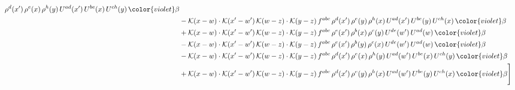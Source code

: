 \begin{align}
\rho^{d}(x')\,\rho^{e}(x)\,\rho^{h}(y)\,U^{ad}(x')\,U^{be}(x)\,U^{ch}(y)\, {\color{violet} \beta} \notag \\ & - \mathcal{K}(x-w) \cdot \mathcal{K}(x'-w')\, \mathcal{K}(w-z)\cdot \mathcal{K}(y-z)\, f^{abc}\, \rho^{d}(x')\,\rho^{e}(y)\,\rho^{h}(x)\,U^{ad}(x')\,U^{be}(y)\,U^{ch}(x)\, {\color{violet} \beta} \notag \\ & + \mathcal{K}(x-w) \cdot \mathcal{K}(x'-w')\, \mathcal{K}(w-z)\cdot \mathcal{K}(y-z)\, f^{abc}\, \rho^{e}(x')\,\rho^{b}(x)\,\rho^{c}(y)\,U^{de}(w')\,U^{ad}(w)\,{\color{violet} \beta} \notag \\ & - \mathcal{K}(x-w) \cdot \mathcal{K}(x'-w')\, \mathcal{K}(w-z)\cdot \mathcal{K}(y-z)\, f^{abc}\, \rho^{e}(x')\,\rho^{b}(y)\,\rho^{c}(x)\,U^{de}(w')\,U^{ad}(w)\, {\color{violet} \beta} \notag \\ & - \mathcal{K}(x-w) \cdot \mathcal{K}(x'-w')\, \mathcal{K}(w-z)\cdot \mathcal{K}(y-z)\, f^{abc}\, \rho^{d}(x')\,\rho^{e}(x)\,\rho^{h}(y)\,U^{ad}(w')\,U^{be}(x)\,U^{ch}(y)\, {\color{violet} \beta} \notag \\ & + \mathcal{K}(x-w) \cdot \mathcal{K}(x'-w')\, \mathcal{K}(w-z)\cdot \mathcal{K}(y-z)\, f^{abc}\, \rho^{d}(x')\,\rho^{e}(y)\,\rho^{h}(x)\,U^{ad}(w')\,U^{be}(y)\,U^{ch}(x)\, {\color{violet} \beta} \Bigg]
    \end{align}
